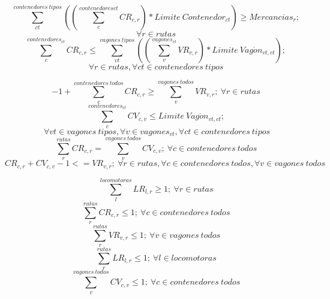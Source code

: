 \documentclass[11pt,spanish]{article}
\begin{document}
			$$
				\sum_{ct}^{contenedores\ tipos}\left(\left( \sum_c^{contenedores{ct}} CR_{c,r} \right) * Limite\ Contenedor_{ct} \right) \geq  Mercancias_r;
			$$
			\begin{equation}
				\label{eq:SatisfaceMercancias}
				\forall r \in rutas
			\end{equation}
			$$
				\sum_c^{contenedores_{ct}} CR_{c,r} \leq \sum_{vt}^{vagones\ tipos} \left( \left(\sum_v^{vagones_{vt}}VR_{v,r}\right)*Limite\ Vag\acute{o}n_{vt,ct} \right);
			$$
			\begin{equation}
				\label{eq:RutaCumpleLimitesContenedores}
				\forall r \in rutas,\forall ct \in contenedores\ tipos
			\end{equation}
			
			\begin{equation}
				\label{eq:EvitaUsoInnecesario}
				-1+\sum_c^{contenedores\ todos} CR_{c,r} \geq \sum_v^{vagones\ todos} VR_{v,r};\ \forall r \in rutas
			\end{equation}
			$$
			\sum_c^{contenedores_{ct}}CV_{c,v} \leq Limite\ Vag\acute{o}n_{vt,ct};
			$$
			\begin{equation}
				\label{eq:VagonesCumplenLimitesContenedores}
				\ \forall vt \in vagones\ tipos, \forall v \in vagones_{vt}, \forall ct \in contenedores\ tipos
			\end{equation}
			\begin{equation}
				\label{eq:CoherenciaTotalidadContenedores}
				\sum_r^{rutas} CR_{c,r} = \sum_v^{vagones\ todos} CV_{c,v};\ \forall c \in contenedores\ todos
			\end{equation}
			\begin{equation}
				\label{eq:Coherencia_CV_CR}
				CR_{c,r}+CV_{c,v}-1<=VR_{v,r};\ \forall r \in rutas, \forall c \in contenedores\ todos, \forall v \in vagones\ todos
			\end{equation}


			\begin{equation}
				\label{eq:alMenosUnaLocomotoraPorRuta}
				\sum_l^{locomotoras}LR_{l,r} \geq 1;\ \forall r \in rutas
			\end{equation}
			\begin{equation}
				\label{eq:unaRutaPorContenedor}
				\sum_r^{rutas}CR_{c,r} \leq 1;\ \forall c \in contenedores\ todos
			\end{equation}
			\begin{equation}
				\label{eq:unaRutaPorVagon}
				\sum_r^{rutas}VR_{v,r} \leq 1;\ \forall v \in vagones\ todos
			\end{equation}
			\begin{equation}
				\label{eq:unaRutaPorLocomotora}
				\sum_r^{rutas} LR_{l,r} \leq 1;\ \forall l \in locomotoras
			\end{equation}
			\begin{equation}
				\label{eq:unVagonPorContenedor}
				\sum_v^{vagones\ todos}CV_{c,v} \leq 1;\ \forall c \in contenedores\ todos
			\end{equation}
\end{document}
